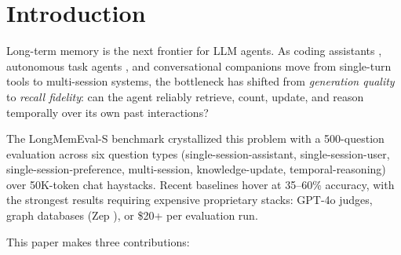 
\section{Introduction}
\label{sec:intro}

Long-term memory is the next frontier for LLM agents. As coding assistants
\citep{anthropic2024claude}, autonomous task agents \citep{schick2024toolformer},
and conversational companions move from single-turn tools to multi-session
systems, the bottleneck has shifted from \emph{generation quality} to
\emph{recall fidelity}: can the agent reliably retrieve, count, update, and
reason temporally over its own past interactions?

The LongMemEval-S benchmark \citep{wu2024longmemeval} crystallized this
problem with a 500-question evaluation across six question types
(single-session-assistant, single-session-user, single-session-preference,
multi-session, knowledge-update, temporal-reasoning) over 50K-token chat
haystacks. Recent baselines hover at 35--60\% accuracy, with the strongest
results requiring expensive proprietary stacks: GPT-4o judges, graph
databases (Zep \citep{zep2025}), or \$20+ per evaluation run.

This paper makes three contributions:

